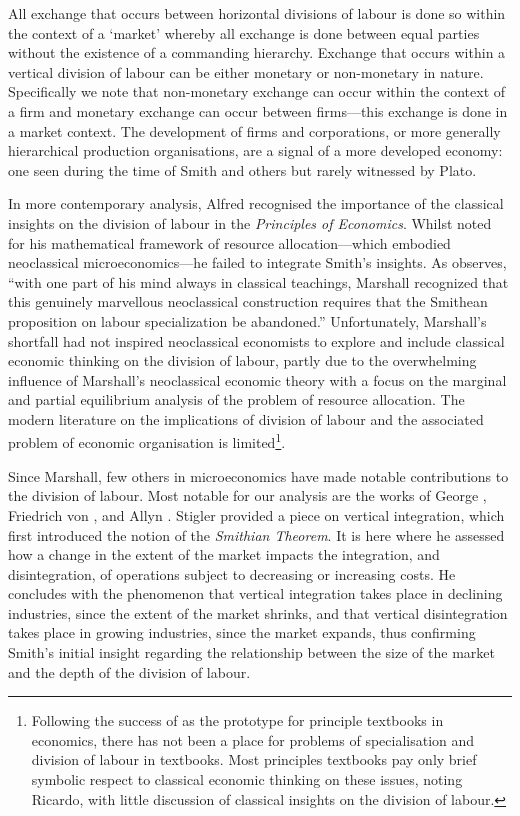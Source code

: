 All exchange that occurs between horizontal divisions of labour is done so within the context of a `market' whereby all exchange is done between equal parties without the existence of a commanding hierarchy. Exchange that occurs within a vertical division of labour can be either monetary or non-monetary in nature. Specifically we note that non-monetary exchange can occur within the context of a firm and monetary exchange can occur between firms---this exchange is done in a market context. The development of firms and corporations, or more generally hierarchical production organisations, are a signal of a more developed economy: one seen during the time of Smith and others but rarely witnessed by Plato.

\medskip \noindent In more contemporary analysis, Alfred \citet{Marshall1890} recognised the importance of the classical insights on the division of labour in the \textit{Principles of Economics}. Whilst noted for his mathematical framework of resource allocation---which embodied neoclassical microeconomics---he failed to integrate Smith's insights. As \citet[p.~6]{BuchananYoon1994} observes, ``with one part of his mind always in classical teachings, Marshall recognized that this genuinely marvellous neoclassical construction requires that the Smithean proposition on labour specialization be abandoned.'' Unfortunately, Marshall's shortfall had not inspired neoclassical economists to explore and include classical economic thinking on the division of labour, partly due to the overwhelming influence of Marshall's neoclassical economic theory with a focus on the marginal and partial equilibrium analysis of the problem of resource allocation. The modern literature on the implications of division of labour and the associated problem of economic organisation is limited\footnote{ Following the success of \citet{Samuelson1948} as the prototype for principle textbooks in economics, there has not been a place for problems of specialisation and division of labour in textbooks. Most principles textbooks pay only brief symbolic respect to classical economic thinking on these issues, noting Ricardo, with little discussion of classical insights on the division of labour.}.

Since Marshall, few others in microeconomics have made notable contributions to the division of labour. Most notable for our analysis are the works of George \citet{Stigler1951}, Friedrich von \citet{Hayek1945}, and Allyn \citet{Young1928}. Stigler provided a piece on vertical integration, which first introduced the notion of the \emph{Smithian Theorem}. It is here where he assessed how a change in the extent of the market impacts the integration, and disintegration, of operations subject to decreasing or increasing costs. He concludes with the phenomenon that vertical integration takes place in declining industries, since the extent of the market shrinks, and that vertical disintegration takes place in growing industries, since the market expands, thus confirming Smith's initial insight regarding the relationship between the size of the market and the depth of the division of labour.

